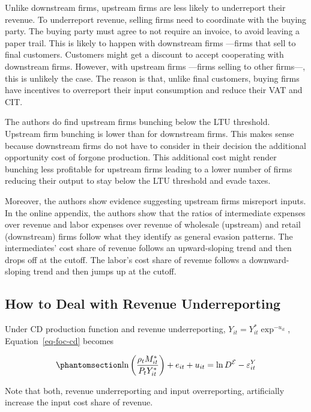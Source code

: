 \documentclass[
  12pt]{article}
\theoremstyle{definition}
\theoremstyle{remark}
\begin{document}
Unlike downstream firms, upstream firms are less likely to underreport
their revenue. To underreport revenue, selling firms need to coordinate
with the buying party. The buying party must agree to not require an
invoice, to avoid leaving a paper trail. This is likely to happen with
downstream firms ---firms that sell to final customers. Customers might
get a discount to accept cooperating with downstream firms. However,
with upstream firms ---firms selling to other firms---, this is unlikely
the case. The reason is that, unlike final customers, buying firms have
incentives to overreport their input consumption and reduce their VAT
and CIT.

The authors do find upstream firms bunching below the LTU threshold.
Upstream firm bunching is lower than for downstream firms. This makes
sense because downstream firms do not have to consider in their decision
the additional opportunity cost of forgone production. This additional
cost might render bunching less profitable for upstream firms leading to
a lower number of firms reducing their output to stay below the LTU
threshold and evade taxes.

Moreover, the authors show evidence suggesting upstream firms misreport
inputs. In the online appendix, the authors show that the ratios of
intermediate expenses over revenue and labor expenses over revenue of
wholesale (upstream) and retail (downstream) firms follow what they
identify as general evasion patterns. The intermediates' cost share of
revenue follows an upward-sloping trend and then drops off at the
cutoff. The labor's cost share of revenue follows a downward-sloping
trend and then jumps up at the cutoff.

\subsection{How to Deal with Revenue
Underreporting}\label{how-to-deal-with-revenue-underreporting}

Under CD production function and revenue underreporting,
\(Y_{it}=Y^*_{it}\exp^{-u_{it}}\), Equation~\ref{eq-foc-cd} becomes

\begin{equation}\phantomsection\label{eq-rev-under}{
    \ln\left(\frac{\rho_t M^*_{it}}{P_{t}Y^*_{it}}\right)+e_{it}+u_{it}=\ln D^{\mathcal{E}}- \varepsilon^Y_{it}
}\end{equation}

Note that both, revenue underreporting and input overreporting,
artificially increase the input cost share of revenue.
\end{document}
